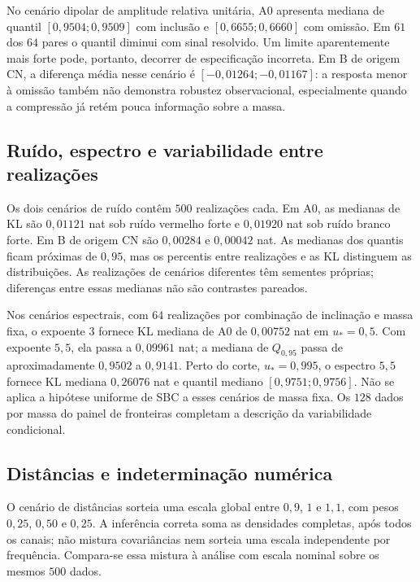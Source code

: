 No cenário dipolar de amplitude relativa unitária, A0 apresenta mediana
de quantil \([0,9504;0,9509]\) com inclusão e
\([0,6655;0,6660]\) com omissão. Em \(61\) dos \(64\) pares o
quantil diminui com sinal resolvido. Um limite aparentemente mais forte
pode, portanto, decorrer de especificação incorreta. Em B de origem CN,
a diferença média nesse cenário é \([-0,01264;-0,01167]\): a resposta
menor à omissão também não demonstra robustez observacional, especialmente
quando a compressão já retém pouca informação sobre a massa.

\subsection{Ruído, espectro e variabilidade entre realizações}

Os dois cenários de ruído contêm \(500\) realizações cada. Em A0, as
medianas de KL são \(0,01121\) nat sob ruído vermelho forte e
\(0,01920\) nat sob ruído branco forte. Em B de origem CN são
\(0,00284\) e \(0,00042\) nat. As medianas dos quantis ficam próximas
de \(0,95\), mas os percentis entre realizações e as KL distinguem
as distribuições. As realizações de cenários diferentes têm sementes
próprias; diferenças entre essas medianas não são contrastes pareados.

Nos cenários espectrais, com \(64\) realizações por combinação de inclinação
e massa fixa, o expoente \(3\) fornece KL mediana de A0 de
\(0,00752\) nat em \(u_*=0,5\). Com expoente \(5,5\), ela passa a
\(0,09961\) nat; a mediana de \(Q_{0,95}\) passa de aproximadamente
\(0,9502\) a \(0,9141\). Perto do corte, \(u_*=0,995\), o espectro
\(5,5\) fornece KL mediana \(0,26076\) nat e quantil mediano
\([0,9751;0,9756]\). Não se aplica a hipótese uniforme de SBC a esses
cenários de massa fixa. Os \(128\) dados por massa do painel de fronteiras
completam a descrição da variabilidade condicional.

\subsection{Distâncias e indeterminação numérica}

O cenário de distâncias sorteia uma escala global entre \(0,9\), \(1\)
e \(1,1\), com pesos \(0,25\), \(0,50\) e \(0,25\). A inferência
correta soma as densidades completas, após todos os canais; não mistura
covariâncias nem sorteia uma escala independente por frequência. Compara-se
essa mistura à análise com escala nominal sobre os mesmos \(500\) dados.

